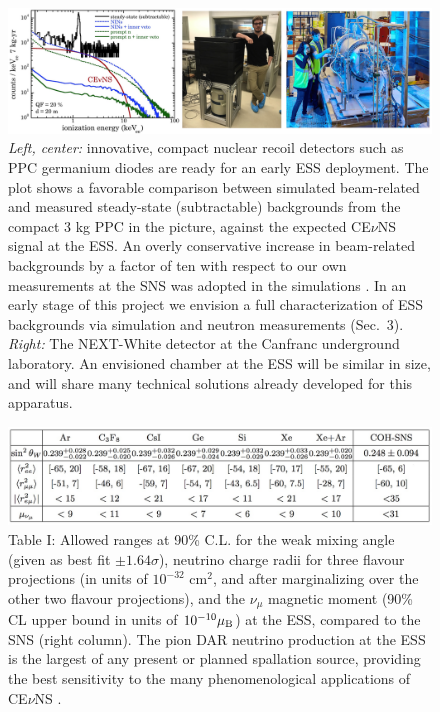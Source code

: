 \documentclass[12pt]{article}
\begin{document}
\begin{figure}[H]
\begin{center}
\includegraphics[width=6.5in]{fig3.eps}
\caption{\label{fig:fig3} \scriptsize {\it Left, center:} innovative, compact nuclear recoil detectors such as PPC germanium diodes \cite{ppc} are ready for an early ESS deployment. The plot shows a favorable comparison between simulated beam-related and measured steady-state (subtractable) backgrounds from the compact 3 kg PPC in the picture, against the expected CE$\nu$NS signal at the ESS. An overly conservative increase in beam-related backgrounds by a factor of ten with respect to our own measurements at the SNS  was adopted in the simulations \cite{ESS}. In an early stage of this project we envision a full characterization of ESS backgrounds via simulation and neutron measurements (Sec.\ 3). {\it Right:} The NEXT-White detector at the Canfranc underground laboratory. An envisioned chamber at the ESS will be similar in size, and will share many technical solutions already developed for this apparatus.}
\end{center}
\end{figure}


\begin{figure}[H]
\begin{center}
\includegraphics[width=6.5in]{table.eps}
\caption{\label{fig:figx} \scriptsize 
Table I: Allowed ranges at 90\% C.L. for the weak mixing
  angle (given as best fit $\pm 1.64 \sigma$), neutrino charge radii for three flavour
  projections  (in units of $10^{-32}$ cm$^2$, and after
  marginalizing over the other two flavour projections), and 
  the $\nu_\mu$ magnetic moment (90\% CL upper bound in units of
  $10^{-10} \mu_{\rm B}$) at the ESS, compared to the SNS (right column). The pion DAR neutrino production at the ESS is the largest of any present or planned spallation source, providing the best sensitivity to the many phenomenological applications of CE$\nu$NS \cite{ESS}. }
\end{center} 
\end{figure}
\end{document}

